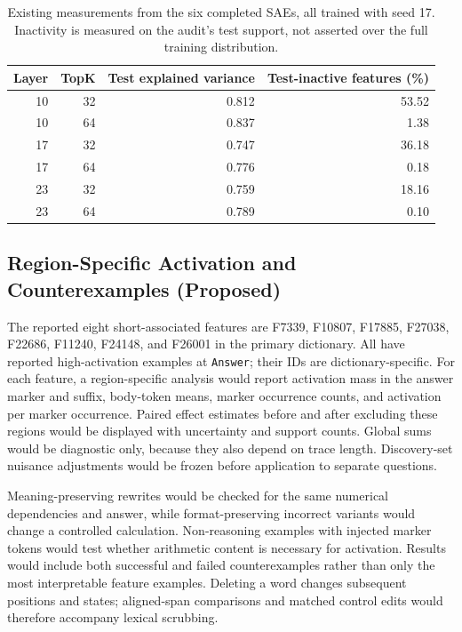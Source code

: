 \begin{table}[htbp]
\centering
\small
\begin{tabular}{rrrr}
\toprule
Layer & TopK & Test explained variance & Test-inactive features (\%) \\
\midrule
10 & 32 & 0.812 & 53.52 \\
10 & 64 & 0.837 & 1.38 \\
17 & 32 & 0.747 & 36.18 \\
17 & 64 & 0.776 & 0.18 \\
23 & 32 & 0.759 & 18.16 \\
23 & 64 & 0.789 & 0.10 \\
\bottomrule
\end{tabular}
\caption{Existing measurements from the six completed SAEs, all trained with seed 17. Inactivity is measured on the audit's test support, not asserted over the full training distribution.}
\label{tab:sae_quality}
\end{table}

\subsection{Region-Specific Activation and Counterexamples (Proposed)}
\label{app:region_protocol}

The reported eight short-associated features are F7339, F10807, F17885, F27038, F22686, F11240, F24148, and F26001 in the primary dictionary.
All have reported high-activation examples at \texttt{Answer}; their IDs are dictionary-specific.
For each feature, a region-specific analysis would report activation mass in the answer marker and suffix, body-token means, marker occurrence counts, and activation per marker occurrence.
Paired effect estimates before and after excluding these regions would be displayed with uncertainty and support counts.
Global sums would be diagnostic only, because they also depend on trace length.
Discovery-set nuisance adjustments would be frozen before application to separate questions.

Meaning-preserving rewrites would be checked for the same numerical dependencies and answer, while format-preserving incorrect variants would change a controlled calculation.
Non-reasoning examples with injected marker tokens would test whether arithmetic content is necessary for activation.
Results would include both successful and failed counterexamples rather than only the most interpretable feature examples.
Deleting a word changes subsequent positions and states; aligned-span comparisons and matched control edits would therefore accompany lexical scrubbing.

